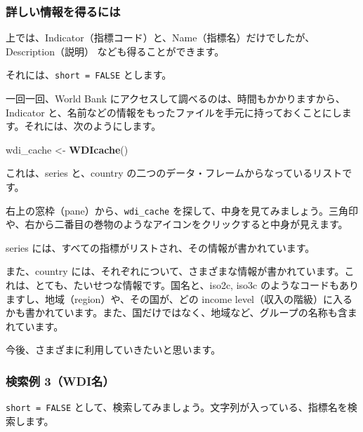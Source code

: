 \documentclass[
  xelatex, ja=standard]{bxjsbook}
\newenvironment{Shaded}{\begin{snugshade}}{\end{snugshade}}
\newcommand{\FunctionTok}[1]{\textcolor[rgb]{0.13,0.29,0.53}{\textbf{#1}}}
\newcommand{\NormalTok}[1]{#1}
\newcommand{\OtherTok}[1]{\textcolor[rgb]{0.56,0.35,0.01}{#1}}
\theoremstyle{definition}
\theoremstyle{definition}
\theoremstyle{definition}
\theoremstyle{definition}
\theoremstyle{remark}
\begin{document}
\hypertarget{ux8a73ux3057ux3044ux60c5ux5831ux3092ux5f97ux308bux306bux306f}{%
\subsubsection{詳しい情報を得るには}\label{ux8a73ux3057ux3044ux60c5ux5831ux3092ux5f97ux308bux306bux306f}}

上では、Indicator（指標コード）と、Name（指標名）だけでしたが、Description（説明） なども得ることができます。

それには、\texttt{short\ =\ FALSE} とします。

一回一回、World Bank にアクセスして調べるのは、時間もかかりますから、Indicator と、名前などの情報をもったファイルを手元に持っておくことにします。それには、次のようにします。

\begin{Shaded}
\begin{Highlighting}[]
\NormalTok{wdi\_cache }\OtherTok{\textless{}{-}} \FunctionTok{WDIcache}\NormalTok{()}
\end{Highlighting}
\end{Shaded}

これは、series と、country の二つのデータ・フレームからなっているリストです。

右上の窓枠（pane）から、\texttt{wdi\_cache} を探して、中身を見てみましょう。三角印や、右から二番目の巻物のようなアイコンをクリックすると中身が見えます。

series には、すべての指標がリストされ、その情報が書かれています。

また、country には、それぞれについて、さまざまな情報が書かれています。これは、とても、たいせつな情報です。国名と、iso2c, iso3c のようなコードもありますし、地域（region）や、その国が、どの income level（収入の階級）に入るかも書かれています。また、国だけではなく、地域など、グループの名称も含まれています。

今後、さまざまに利用していきたいと思います。

\hypertarget{ux691cux7d22ux4f8b-3wdiux540d}{%
\subsubsection{検索例 3（WDI名）}\label{ux691cux7d22ux4f8b-3wdiux540d}}

\texttt{short\ =\ FALSE} として、検索してみましょう。文字列が入っている、指標名を検索します。
\end{document}
